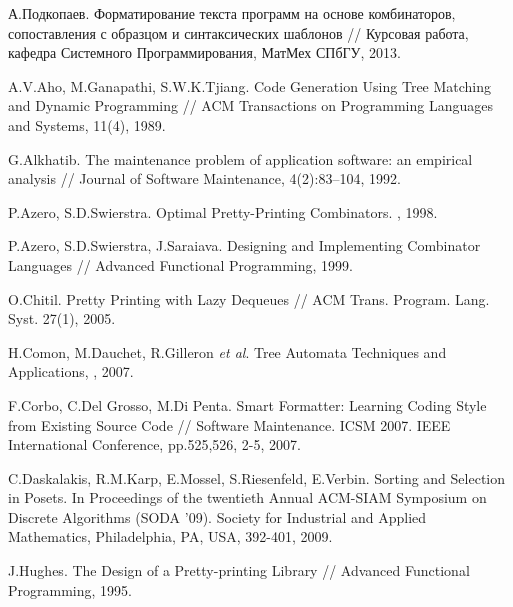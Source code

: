
% 
% 

\begin{thebibliography}{9001}

 А.Подкопаев. Форматирование текста программ на основе комбинаторов, сопоставления с образцом и синтаксических шаблонов
// Курсовая работа, кафедра Системного Программирования, МатМех СПбГУ, 2013.


 A.V.Aho, M.Ganapathi, S.W.K.Tjiang. Code Generation Using Tree Matching and Dynamic Programming // ACM Transactions on Programming Languages and Systems, 
11(4), 1989.


 G.Alkhatib. The maintenance problem of application software:
an empirical analysis // Journal of Software Maintenance, 4(2):83–104, 1992.

 P.Azero, S.D.Swierstra. Optimal Pretty-Printing Combinators. , 1998.

 P.Azero, S.D.Swierstra, J.Saraiava. Designing and Implementing Combinator Languages // Advanced Functional Programming, 1999.

 O.Chitil. Pretty Printing with Lazy Dequeues // ACM Trans. Program. Lang. Syst. 27(1), 2005.

 H.Comon, M.Dauchet, R.Gilleron \emph{et al}. Tree Automata Techniques and Applications, , 2007.

 F.Corbo, C.Del Grosso, M.Di Penta. Smart Formatter: Learning Coding Style from
Existing Source Code // Software Maintenance. ICSM 2007. IEEE International Conference, pp.525,526, 2-5, 2007.

 C.Daskalakis, R.M.Karp, E.Mossel, S.Riesenfeld, E.Verbin.
Sorting and Selection in Posets.
In Proceedings of the twentieth Annual ACM-SIAM Symposium on Discrete
Algorithms (SODA '09). Society for Industrial and Applied Mathematics, Philadelphia, PA, USA, 392-401, 2009.

 J.Hughes. The Design of a Pretty-printing Library // Advanced Functional Programming, 1995.


\end{thebibliography}
